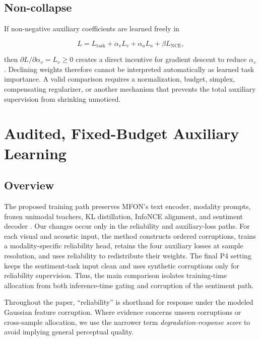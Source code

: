 \subsection{Non-collapse}\label{non-collapse}

If non-negative auxiliary coefficients are learned freely in

\[
L=L_{\mathrm{task}}+\alpha_vL_v+\alpha_aL_a+\beta L_{\mathrm{NCE}},
\]

then \(\partial L/\partial\alpha_v=L_v\ge0\) creates a direct incentive
for gradient descent to reduce \(\alpha_v\). Declining weights therefore
cannot be interpreted automatically as learned task importance. A valid
comparison requires a normalization, budget, simplex, compensating
regularizer, or another mechanism that prevents the total auxiliary
supervision from shrinking unnoticed.

\section{Audited, Fixed-Budget Auxiliary
Learning}\label{audited-fixed-budget-auxiliary-learning}

\subsection{Overview}\label{overview}

The proposed training path preserves MFON's text encoder, modality
prompts, frozen unimodal teachers, KL distillation, InfoNCE alignment,
and sentiment decoder \cite{zhang2025mfon}. Our changes occur only in
the reliability and auxiliary-loss paths. For each visual and acoustic
input, the method constructs ordered corruptions, trains a
modality-specific reliability head, retains the four auxiliary losses at
sample resolution, and uses reliability to redistribute their weights.
The final P4 setting keeps the sentiment-task input clean and uses
synthetic corruptions only for reliability supervision. Thus, the main
comparison isolates training-time allocation from both inference-time
gating and corruption of the sentiment path.

Throughout the paper, ``reliability'' is shorthand for response under the
modeled Gaussian feature corruption. Where evidence concerns unseen
corruptions or cross-sample allocation, we use the narrower term
\emph{degradation-response score} to avoid implying general perceptual quality.

